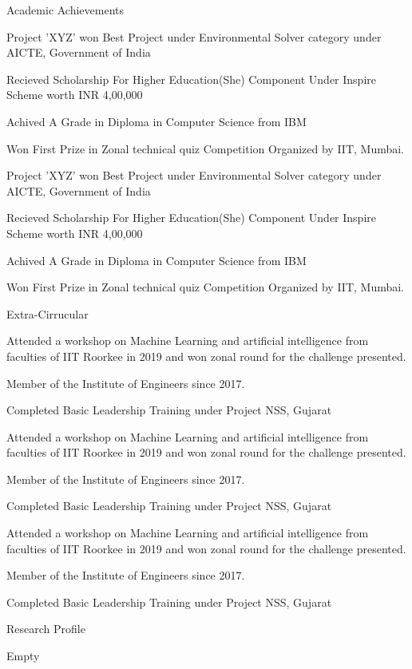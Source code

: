 \documentclass{resume}
\begin{document}
\begin{rSection}{Academic Achievements} 
\item Project 'XYZ' won Best Project under Environmental Solver category under AICTE, Government of India
\item Recieved Scholarship For Higher Education(She) Component Under Inspire Scheme worth INR 4,00,000
\item Achived A Grade in Diploma in Computer Science from IBM
\item Won First Prize in Zonal technical quiz Competition Organized by IIT, Mumbai.
\item Project 'XYZ' won Best Project under Environmental Solver category under AICTE, Government of India
\item Recieved Scholarship For Higher Education(She) Component Under Inspire Scheme worth INR 4,00,000
\item Achived A Grade in Diploma in Computer Science from IBM
\item Won First Prize in Zonal technical quiz Competition Organized by IIT, Mumbai.
\end{rSection}

\begin{rSection}{Extra-Cirrucular} 
\item Attended a workshop on Machine Learning and artificial intelligence from faculties of IIT Roorkee in 2019 and won zonal round for the challenge presented.
\item Member of the  Institute of Engineers since 2017.
\item Completed Basic Leadership Training under Project NSS, Gujarat
\item Attended a workshop on Machine Learning and artificial intelligence from faculties of IIT Roorkee in 2019 and won zonal round for the challenge presented.
\item Member of the  Institute of Engineers since 2017.
\item Completed Basic Leadership Training under Project NSS, Gujarat
\item Attended a workshop on Machine Learning and artificial intelligence from faculties of IIT Roorkee in 2019 and won zonal round for the challenge presented.
\item Member of the  Institute of Engineers since 2017.
\item Completed Basic Leadership Training under Project NSS, Gujarat

\end{rSection}
\begin{rSection}{Research Profile}
 \item Empty
\end{rSection}
\end{document}
